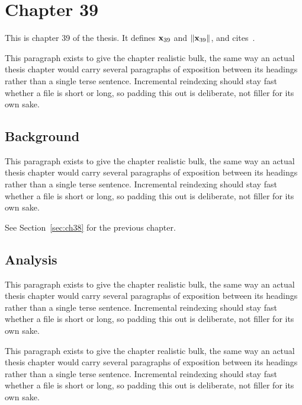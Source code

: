 \section{Chapter 39}
\label{sec:ch39}

This is chapter 39 of the thesis. It defines $\mathbf{x}_{39}$ and $\lVert \mathbf{x}_{39} \rVert$, and cites~\cite{ref1}.

This paragraph exists to give the chapter realistic bulk, the same way an actual thesis chapter would carry several paragraphs of exposition between its headings rather than a single terse sentence. Incremental reindexing should stay fast whether a file is short or long, so padding this out is deliberate, not filler for its own sake.

\subsection{Background}
\label{sec:ch39:background}

This paragraph exists to give the chapter realistic bulk, the same way an actual thesis chapter would carry several paragraphs of exposition between its headings rather than a single terse sentence. Incremental reindexing should stay fast whether a file is short or long, so padding this out is deliberate, not filler for its own sake.

See Section~\ref{sec:ch38} for the previous chapter.

\subsection{Analysis}
\label{sec:ch39:analysis}

This paragraph exists to give the chapter realistic bulk, the same way an actual thesis chapter would carry several paragraphs of exposition between its headings rather than a single terse sentence. Incremental reindexing should stay fast whether a file is short or long, so padding this out is deliberate, not filler for its own sake.

This paragraph exists to give the chapter realistic bulk, the same way an actual thesis chapter would carry several paragraphs of exposition between its headings rather than a single terse sentence. Incremental reindexing should stay fast whether a file is short or long, so padding this out is deliberate, not filler for its own sake.
